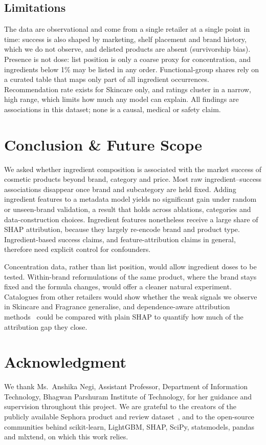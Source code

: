 \documentclass[11pt,a4paper]{article}
\begin{document}
\subsection{Limitations}
The data are observational and come from a single retailer at a single point in time: success is also shaped by marketing, shelf placement and brand history, which we do not observe, and delisted products are absent (survivorship bias). Presence is not dose: list position is only a coarse proxy for concentration, and ingredients below 1\% may be listed in any order. Functional-group shares rely on a curated table that maps only part of all ingredient occurrences. Recommendation rate exists for Skincare only, and ratings cluster in a narrow, high range, which limits how much any model can explain. All findings are associations in this dataset; none is a causal, medical or safety claim.

\section{Conclusion \& Future Scope}
We asked whether ingredient composition is associated with the market success of cosmetic products beyond brand, category and price. Most raw ingredient--success associations disappear once brand and subcategory are held fixed. Adding \NIngredientFeatures{} ingredient features to a metadata model yields no significant gain under random or unseen-brand validation, a result that holds across ablations, categories and data-construction choices. Ingredient features nonetheless receive a large share of SHAP attribution, because they largely re-encode brand and product type. Ingredient-based success claims, and feature-attribution claims in general, therefore need explicit control for confounders.

Concentration data, rather than list position, would allow ingredient doses to be tested. Within-brand reformulations of the same product, where the brand stays fixed and the formula changes, would offer a cleaner natural experiment. Catalogues from other retailers would show whether the weak signals we observe in Skincare and Fragrance generalise, and dependence-aware attribution methods~\cite{aas2021} could be compared with plain SHAP to quantify how much of the attribution gap they close.

\section{Acknowledgment}
We thank Ms.\ Anshika Negi, Assistant Professor, Department of Information Technology, Bhagwan Parshuram Institute of Technology, for her guidance and supervision throughout this project. We are grateful to the creators of the publicly available Sephora product and review dataset~\cite{sephoradata}, and to the open-source communities behind scikit-learn, LightGBM, SHAP, SciPy, statsmodels, pandas and mlxtend, on which this work relies.
\end{document}
